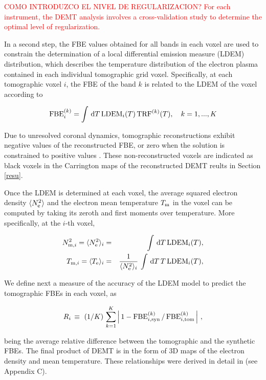 \documentclass[namedreferences]{solarphysics}
\newcommand{\LDEM}{{\rm LDEM}}
\newcommand{\FBE}{{\rm FBE}}
\newcommand{\TRF}{{\rm TRF}}
\newcommand{\Te}{T_{\rm e}}
\newcommand{\Tm}{T_{\rm m}}
\newcommand{\Tmi}{T_{{\rm m},i}}
\newcommand{\Ne}{N_{\rm e}}
\newcommand{\Nsqmi}{N^2_{{\rm m},i}}
\newcommand{\Nsqm}{N^2_{{\rm m}}}
\newcommand{\sqravgN}{\sqrt{\Nsqm}}
\def\diego#1{\textcolor{red}{#1}}
\def\temp#1{\textcolor{gray}{#1}}
\begin{document}
\begin{article}
\diego{COMO INTRODUZCO EL NIVEL DE REGULARIZACION? For each instrument, the DEMT analysis involves a cross-validation study to determine the optimal level of regularization.}

{In a second step, the FBE values obtained for all bands in each voxel are used to constrain the determination of a {local differential emission measure} (LDEM) distribution, which describes the temperature distribution of the electron plasma contained in each individual tomographic grid voxel. Specifically, at each tomographic voxel $i$, the FBE of the band $k$ is related to the LDEM of the voxel according to}


\begin{equation}\label{fbeldem}
\FBE_i^{(k)}  = \int\,\textrm{d}T\,\LDEM_i(T)\,{\TRF}^{(k)}(T), \ \ \ {k=1,...,K}
\end{equation}

{
Due to unresolved coronal dynamics, tomographic reconstructions exhibit negative values of the reconstructed FBE, or zero when the solution is constrained to positive values \citep{frazin_2000,frazin_2009}. These non-reconstructed voxels are indicated as black voxels in the Carrington maps of the reconstructed DEMT reults in Section \ref{resu}.
}

Once the LDEM is determined at each voxel, the average squared electron density $\langle \Ne^2 \rangle$ and the electron mean temperature $\Tm$ in the voxel can be computed by taking its zeroth and first moments over temperature. More specifically, at the $i$-th voxel,

{
\begin{eqnarray}\label{momento1}
 \Nsqmi = \langle \Ne^2 \rangle_i &=& \int\,\textrm{d}T\,\LDEM_i(T),\label{Ne} \\ 
\label{momento2}
 \Tmi  = \langle \Te \rangle_i &=& \frac{1}{\langle \Ne^2 \rangle_i}\,\int\,\textrm{d}T\,T\,\LDEM_i(T),\label{Tm} 
\end{eqnarray}
}

We define next a measure of the accuracy of the LDEM model to predict the tomographic FBEs in each voxel, as

\begin{equation}\label{R}
R_i \, \equiv \ (1/K) \, \sum_{k=1}^K \left| \, 1 - \FBE^{(k)}_{i,\rm syn}\,/\,\FBE^{(k)}_{i,\rm tom}\, \right| \,,
\end{equation}

being the average relative difference between the tomographic and the synthetic FBEs. The final product of DEMT is in the form of 3D maps of the electron density and mean temperature. These relationships {were} derived in detail in \citealt{frazin_2009} (see Appendix C).\\


\end{article}
\end{document}
